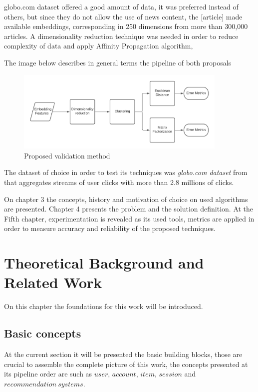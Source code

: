 \documentclass[ecp,tc,english]{iiufrgs}
\begin{document}
globo.com dataset offered a good amount of data, it was preferred instead of others, but since they do not allow the use of news content, the [article] made available embeddings, corresponding in 250 dimensions from more than 300,000 articles. A dimensionality reduction technique was needed in order to reduce complexity of data and apply Affinity Propagation algorithm,

The image below describes in general terms the pipeline of both proposals

\begin{figure}[!ht]
    \centering
    \includegraphics[width=0.9\textwidth]{images/experiment.png}
    \caption{Proposed validation method}
    \label{fig:my_label}
\end{figure}

The dataset of choice in order to test its techniques was  \textit{globo.com dataset} from \cite{deSouzaPereiraMoreira:2018:CDL:3240323.3240331} 
that aggregates streams of user clicks with more than 2.8 millions of clicks.


On chapter 3 the concepts, history and motivation of choice on used algorithms are presented. Chapter 4 presents the problem and the solution definition.
At the Fifth chapter, experimentation is revealed as its used tools, metrics are applied in order to measure accuracy and reliability of the proposed techniques.


\chapter{Theoretical Background and Related Work}
On this chapter the foundations for this work will be introduced.

    \section{Basic concepts}
    At the current section it will be presented the basic building blocks, those are crucial to assemble the complete picture of this work, the concepts presented at its pipeline order are such as \(user\), \(account\), \(item\), \(session\) and \(recommendation\ systems\).
        
\end{document}
